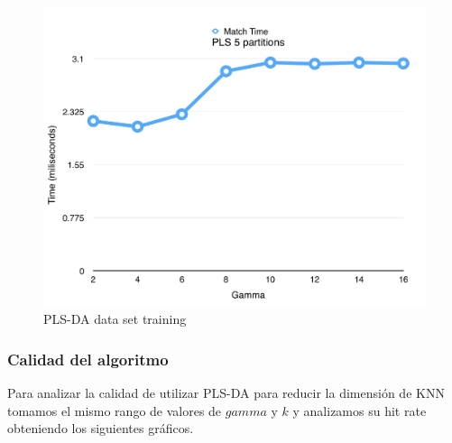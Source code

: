 \begin{figure}[h!]
  \begin{center}
	\includegraphics[scale=0.6]{exp2/PLS-Match-Time.png}
	\caption{PLS-DA data set training}
  \end{center}
\end{figure}

\subsubsection*{Calidad del algoritmo}

Para analizar la calidad de utilizar PLS-DA para reducir la dimensión de KNN tomamos el mismo rango de valores de $gamma$ y $k$ y analizamos su hit rate obteniendo los siguientes gráficos.

